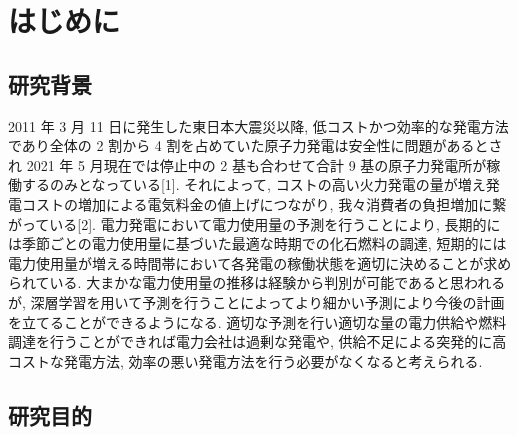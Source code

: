 \section{はじめに}

\subsection{研究背景}
2011 年 3 月 11 日に発生した東日本大震災以降, 低コストかつ効率的な発電方法であり全体の 2 割から 4 割を占めていた原子力発電は安全性に問題があるとされ 2021 年 5 月現在では停止中の 2 基も合わせて合計 9 基の原子力発電所が稼働するのみとなっている[1].
それによって, コストの高い火力発電の量が増え発電コストの増加による電気料金の値上げにつながり, 我々消費者の負担増加に繋がっている[2].
電力発電において電力使用量の予測を行うことにより, 長期的には季節ごとの電力使用量に基づいた最適な時期での化石燃料の調達, 短期的には電力使用量が増える時間帯において各発電の稼働状態を適切に決めることが求められている.
大まかな電力使用量の推移は経験から判別が可能であると思われるが, 深層学習を用いて予測を行うことによってより細かい予測により今後の計画を立てることができるようになる.
適切な予測を行い適切な量の電力供給や燃料調達を行うことができれば電力会社は過剰な発電や, 供給不足による突発的に高コストな発電方法, 効率の悪い発電方法を行う必要がなくなると考えられる.
\newpage
\subsection{研究目的}
